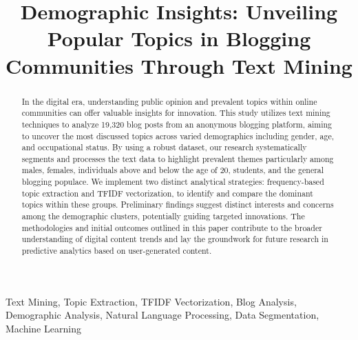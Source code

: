 \documentclass[conference,a4paper]{IEEEtran}
\begin{document}
\title{Demographic Insights: Unveiling Popular Topics in Blogging Communities Through Text Mining}

\author{
\and
{}
}

\maketitle

\begin{abstract}
In the digital era, understanding public opinion and prevalent topics within
online communities can offer valuable insights for innovation.
This study utilizes text mining techniques to analyze 19,320 blog posts from an
anonymous blogging platform, aiming to uncover the most discussed topics across
varied demographics including gender, age, and occupational status.
By using a robust dataset, our research systematically segments and processes
the text data to highlight prevalent themes particularly among males, females,
individuals above and below the age of 20, students, and the general blogging
populace.
We implement two distinct analytical strategies: frequency-based topic
extraction and TFIDF vectorization, to identify and compare the dominant topics
within these groups.
Preliminary findings suggest distinct interests and concerns among the
demographic clusters, potentially guiding targeted innovations.
The methodologies and initial outcomes outlined in this paper contribute to the
broader understanding of digital content trends and lay the groundwork for
future research in predictive analytics based on user-generated content.
\end{abstract}

\begin{IEEEkeywords}
Text Mining, Topic Extraction, TFIDF Vectorization, Blog Analysis, Demographic Analysis, Natural Language Processing, Data Segmentation, Machine Learning
\end{IEEEkeywords}
\end{document}
